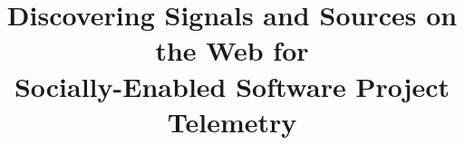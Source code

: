 \documentclass{sig-alternate-05-2015}
\begin{document}






%

\title{%
Discovering Signals and Sources on the Web for \\
Socially-Enabled Software Project Telemetry
}

%
%
%
%
%
\end{document}
